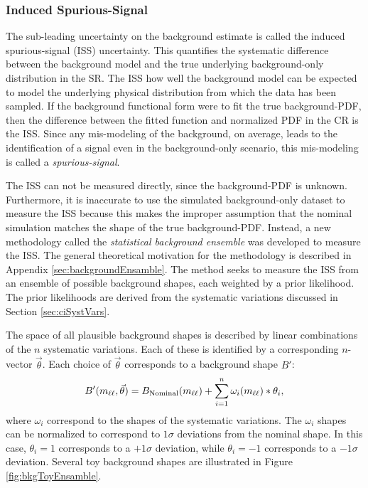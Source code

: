 \subsubsection{Induced Spurious-Signal}



The sub-leading uncertainty on the background estimate is called the induced spurious-signal (ISS) uncertainty.
This quantifies the systematic difference between the background model and the true underlying background-only distribution in the SR.
The ISS how well the background model can be expected to model the underlying physical distribution from which the data has been sampled.
If the background functional form were to fit the true background-PDF, then the difference between the fitted function and normalized PDF in the CR is the ISS.
Since any mis-modeling of the background, on average, leads to the identification of a signal even in the background-only scenario, this mis-modeling is called a \emph{spurious-signal}.

The ISS can not be measured directly, since the background-PDF is unknown.
Furthermore, it is inaccurate to use the simulated background-only dataset to measure the ISS because this makes the improper assumption that the nominal simulation matches the shape of the true background-PDF.
Instead, a new methodology called the \emph{statistical background ensemble} was developed to measure the ISS.
The general theoretical motivation for the methodology is described in Appendix \ref{sec:backgroundEnsamble}.
The method seeks to measure the ISS from an ensemble of possible background shapes, each weighted by a prior likelihood.
The prior likelihoods are derived from the systematic variations discussed in Section \ref{sec:ciSystVars}.

The space of all plausible background shapes is described by linear combinations of the $n$ systematic variations.
Each of these is identified by a corresponding $n$-vector $\vec{\theta}$.
Each choice of $\vec{\theta}$ corresponds to a background shape $B'$:
\begin{equation}\begin{split}
    B'(m_{\ell\ell},\vec{\theta}) = B_\text{Nominal}(m_{\ell\ell}) + \sum_{i=1}^n \omega_i(m_{\ell\ell})*\theta_i,
\end{split}\end{equation} 
where $\omega_i$ correspond to the shapes of the systematic variations.
The $\omega_i$ shapes can be normalized to correspond to $1\sigma$ deviations from the nominal shape.
In this case, $\theta_i=1$ corresponds to a $+1\sigma$ deviation, while $\theta_i=-1$ corresponds to a $-1\sigma$ deviation.
Several toy background shapes are illustrated in Figure \ref{fig:bkgToyEnsamble}.



